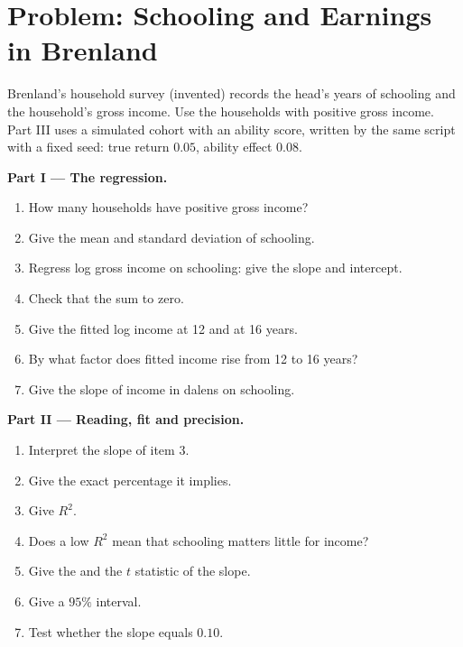 \section{Problem: Schooling and Earnings in Brenland}\label{sec:b1:simple-regression:problem}

\begin{problem}\label{pb:b1:simple-regression:brenland}
Brenland's household survey (invented) records the head's years of
schooling and the household's gross income. Use the households with
positive gross income. Part III uses a simulated cohort with an ability
score, written by the same script with a fixed seed: true return $0.05$,
ability effect $0.08$.

\medskip\noindent\textbf{Part I --- The regression.}
\begin{enumerate}
  \item How many households have positive gross income?
  \item Give the mean and standard deviation of schooling.
  \item Regress log gross income on schooling: give the slope and intercept.
  \item Check that the  sum to zero.
  \item Give the fitted log income at 12 and at 16 years.
  \item By what factor does fitted income rise from 12 to 16 years?
  \item Give the slope of income in dalens on schooling.
\end{enumerate}

\medskip\noindent\textbf{Part II --- Reading, fit and precision.}
\begin{enumerate}[resume]
  \item Interpret the slope of item 3.
  \item Give the exact percentage it implies.
  \item Give $R^2$.
  \item Does a low $R^2$ mean that schooling matters little for income?
  \item Give the  and the $t$ statistic of the slope.
  \item Give a $95\%$ interval.
  \item Test whether the slope equals $0.10$.
\end{enumerate}


\end{problem}
